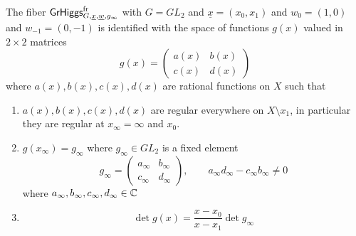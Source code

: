 \documentclass[12pt,psamsfonts,reqno]{amsart}
\begin{document}
 \begin{proposition} The fiber $\mathsf{GrHiggs}^{\mathrm{fr}}_{G,\underline{x}, \underline{w}, g_\infty}$
   with $G = GL_2$ and $\underline{x} = (x_0, x_1)$ and $w_0 = (1,0)$ and $w_{-1} = (0,-1)$ is identified with the space of functions $g(x)$
   valued in $2 \times 2$ matrices
   \begin{equation}
     g(x) =
     \begin{pmatrix}
       a(x) & b(x) \\
       c(x) & d(x)
     \end{pmatrix}
   \end{equation}
   where $a(x), b(x), c(x), d(x)$ are rational functions on $X$ such that 
   \begin{enumerate}
   \item $a(x), b(x), c(x), d(x)$ are regular everywhere on $X \setminus {x_1}$,
     in particular they are regular at $x_\infty = \infty$ and $x_0$.
   \item $g(x_\infty) = g_\infty$ where $g_\infty \in GL_2$ is a fixed element
     \begin{equation}
       g_\infty =
       \begin{pmatrix}
         a_\infty & b_\infty \\
         c_\infty & d_\infty 
       \end{pmatrix}, \qquad a_\infty d_\infty - c_\infty b_\infty \neq 0 
     \end{equation}
where $a_\infty, b_\infty, c_\infty, d_\infty \in \mathbb C$ 
   \item
     \begin{equation}
       \det g(x) =  \frac{ x- x_0}{ x - x_1}  \det g_\infty
     \end{equation}
   \end{enumerate}
 

\end{proposition}
\end{document}
